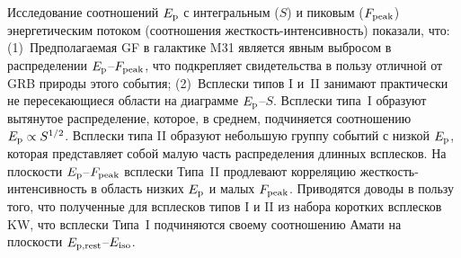 Исследование соотношений $E_{\mathrm{p}}$ с интегральным ($S$) и пиковым ($F_{\mathrm{peak}}$) 
энергетическим потоком (соотношения жесткость-интенсивность) показали, что:
(1)~Предполагаемая GF в галактике M31 является явным выбросом в распределении $E_{\mathrm{p}}$--$F_{\mathrm{peak}}$, 
что подкрепляет свидетельства в пользу отличной от GRB природы этого события;
(2)~Всплески типов I и~II занимают практически не пересекающиеся области на диаграмме $E_{\mathrm{p}}$--$S$.
Всплески типа~I образуют вытянутое распределение, которое, в среднем, подчиняется 
соотношению $E_{\mathrm{p}} \propto S^{1/2}$. Всплески типа II образуют небольшую группу событий
с низкой $E_{\mathrm{p}}$, которая представляет собой малую часть распределения длинных всплесков.
На плоскости $E_{\mathrm{p}}$--$F_{\mathrm{peak}}$ всплески Типа~II продлевают корреляцию 
жесткость-интенсивность в область низких $E_{\mathrm{p}}$ и малых $F_{\mathrm{peak}}$.
Приводятся доводы в пользу того, что полученные для всплесков типов I и II из набора коротких 
всплесков KW, что всплески Типа~I подчиняются 
своему соотношению Амати на плоскости $E_{\mathrm{p,rest}}$--$E_{\mathrm{iso}}$.

